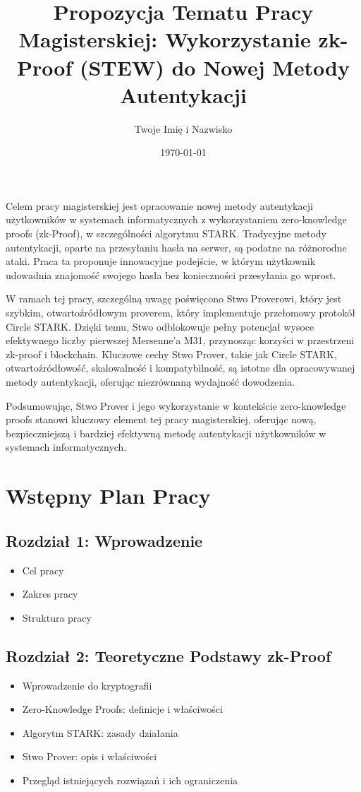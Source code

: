 \documentclass{article}
\title{Propozycja Tematu Pracy Magisterskiej: Wykorzystanie zk-Proof (STEW) do Nowej Metody Autentykacji}
\author{Twoje Imię i Nazwisko}
\date{\today}
\begin{document}
\maketitle

Celem pracy magisterskiej jest opracowanie nowej metody autentykacji użytkowników w systemach informatycznych z wykorzystaniem zero-knowledge proofs (zk-Proof), w szczególności algorytmu STARK. Tradycyjne metody autentykacji, oparte na przesyłaniu hasła na serwer, są podatne na różnorodne ataki. Praca ta proponuje innowacyjne podejście, w którym użytkownik udowadnia znajomość swojego hasła bez konieczności przesyłania go wprost.

W ramach tej pracy, szczególną uwagę poświęcono Stwo Proverowi, który jest szybkim, otwartoźródłowym proverem, 
który implementuje przełomowy protokół Circle STARK. Dzięki temu, Stwo odblokowuje pełny potencjał wysoce 
efektywnego liczby pierwszej Mersenne'a M31, przynosząc korzyści w przestrzeni zk-proof i blockchain. 
Kluczowe cechy Stwo Prover, takie jak Circle STARK, otwartoźródłowość, skalowalność i kompatybilność, 
są istotne dla opracowywanej metody autentykacji, oferując niezrównaną wydajność dowodzenia. 

Podsumowując, Stwo Prover i jego wykorzystanie w kontekście zero-knowledge proofs stanowi kluczowy element tej pracy magisterskiej, oferując nową, bezpieczniejszą i bardziej efektywną metodę autentykacji użytkowników w systemach informatycznych.

\section{Wstępny Plan Pracy}
\subsection{Rozdział 1: Wprowadzenie}
\begin{itemize}
    \item Cel pracy
    \item Zakres pracy
    \item Struktura pracy
\end{itemize}

\subsection{Rozdział 2: Teoretyczne Podstawy zk-Proof}
\begin{itemize}
    \item Wprowadzenie do kryptografii
    \item Zero-Knowledge Proofs: definicje i właściwości
    \item Algorytm STARK: zasady działania
    \item Stwo Prover: opis i właściwości
    \item Przegląd istniejących rozwiązań i ich ograniczenia
\end{itemize}
\end{document}

